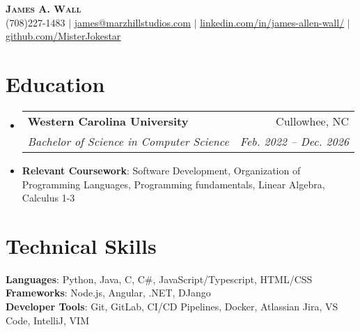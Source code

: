 \documentclass[letterpaper,11pt]{article}
\makeatletter
\newcommand{\resumeItem}[1]{
  \item\small{
    {#1 \vspace{-2pt}}
  }
}
\newcommand{\resumeSubheading}[4]{
  \vspace{-2pt}\item
    \begin{tabular*}{0.97\textwidth}[t]{l@{\extracolsep{\fill}}r}
      \textbf{#1} & #2 \\
      \textit{\small#3} & \textit{\small #4} \\
    \end{tabular*}\vspace{-7pt}
}
\newcommand{\resumeSubHeadingListStart}{\begin{itemize}[leftmargin=0.15in, label={}]}
\newcommand{\resumeSubHeadingListEnd}{\end{itemize}}
\makeatother
\begin{document}

\begin{center}
    \textbf{\Huge \scshape James A. Wall} \\ \vspace{1pt}
    \small (708)227-1483 $|$ \href{mailto:james@marzhillstudios.com.com}{\underline{james@marzhillstudios.com}} $|$ 
    \href{https://www.linkedin.com/in/james-allen-wall/}{\underline{linkedin.com/in/james-allen-wall/}} $|$
    \href{https://github.com/MisterJokestar}{\underline{github.com/MisterJokestar}}
\end{center}


\section{Education}
  \resumeSubHeadingListStart
    \resumeSubheading
      {Western Carolina University}{Cullowhee, NC}
      {Bachelor of Science in Computer Science}{Feb. 2022 -- Dec. 2026}
      \resumeItem
          {\textbf{Relevant Coursework}: Software Development, Organization of Programming Languages, Programming fundamentals, Linear Algebra, Calculus 1-3}
  \resumeSubHeadingListEnd

\section{Technical Skills}
 \begin{itemize}[leftmargin=0.15in, label={}]
    \small{\item{
     \textbf{Languages}{: Python, Java, C, C\#, JavaScript/Typescript, HTML/CSS} \\
     \textbf{Frameworks}{: Node.js, Angular, .NET, DJango} \\
     \textbf{Developer Tools}{: Git, GitLab, CI/CD Pipelines, Docker, Atlassian Jira, VS Code, IntelliJ, VIM}
    }}
 \end{itemize}

\end{document}
